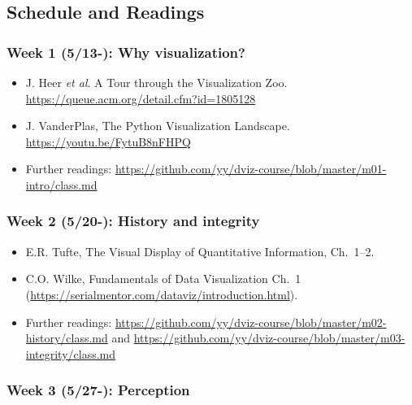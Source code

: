 \subsection{Schedule and Readings}\label{sub:schedule}%

\subsubsection{Week 1 (5/13-): Why visualization?} %

\begin{itemize}\itemsep0em 
\item J. Heer \emph{et al}. A Tour through the Visualization Zoo. \url{https://queue.acm.org/detail.cfm?id=1805128}
\item J. VanderPlas, The Python Visualization Landscape. \url{https://youtu.be/FytuB8nFHPQ}
\item Further readings: \url{https://github.com/yy/dviz-course/blob/master/m01-intro/class.md}
\end{itemize}	

\subsubsection{Week 2 (5/20-): History and integrity}%

\begin{itemize}\itemsep0em 
\item E.R. Tufte, The Visual Display of Quantitative Information, Ch.~1--2.
\item C.O. Wilke, Fundamentals of Data Visualization Ch.~1 (\url{https://serialmentor.com/dataviz/introduction.html}). 
\item Further readings: \url{https://github.com/yy/dviz-course/blob/master/m02-history/class.md} and \url{https://github.com/yy/dviz-course/blob/master/m03-integrity/class.md}
\end{itemize}	


\subsubsection{Week 3 (5/27-): Perception}%

